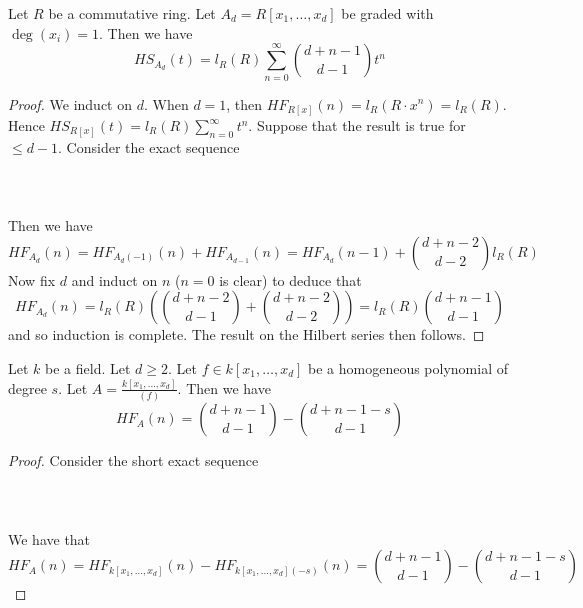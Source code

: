 \documentclass[a4paper]{article}
\begin{document}
\begin{eg}{}{} Let $R$ be a commutative ring. Let $A_d=R[x_1,\dots,x_d]$ be graded with $\deg(x_i)=1$. Then we have $$HS_{A_d}(t)=l_R(R)\sum_{n=0}^\infty\binom{d+n-1}{d-1}t^n$$ 
\begin{proof}
We induct on $d$. When $d=1$, then $HF_{R[x]}(n)=l_R(R\cdot x^n)=l_R(R)$. Hence $HS_{R[x]}(t)=l_R(R)\sum_{n=0}^\infty t^n$. Suppose that the result is true for $\leq d-1$. Consider the exact sequence \\~\\
\\~\\
Then we have $$HF_{A_d}(n)=HF_{A_d(-1)}(n)+HF_{A_{d-1}}(n)=HF_{A_d}(n-1)+\binom{d+n-2}{d-2}l_R(R)$$ Now fix $d$ and induct on $n$ ($n=0$ is clear) to deduce that $$HF_{A_d}(n)=l_R(R)\left(\binom{d+n-2}{d-1}+\binom{d+n-2}{d-2}\right)=l_R(R)\binom{d+n-1}{d-1}$$ and so induction is complete. The result on the Hilbert series then follows. 
\end{proof}
\end{eg}

\begin{eg}{}{} Let $k$ be a field. Let $d\geq 2$. Let $f\in k[x_1,\dots,x_d]$ be a homogeneous polynomial of degree $s$. Let $A=\frac{k[x_1,\dots,x_d]}{(f)}$. Then we have $$HF_A(n)=\binom{d+n-1}{d-1}-\binom{d+n-1-s}{d-1}$$ 
\begin{proof}
Consider the short exact sequence \\~\\
\\~\\
We have that $$HF_A(n)=HF_{k[x_1,\dots,x_d]}(n)-HF_{k[x_1,\dots,x_d](-s)}(n)=\binom{d+n-1}{d-1}-\binom{d+n-1-s}{d-1}$$
\end{proof}
\end{eg}
\end{document}
